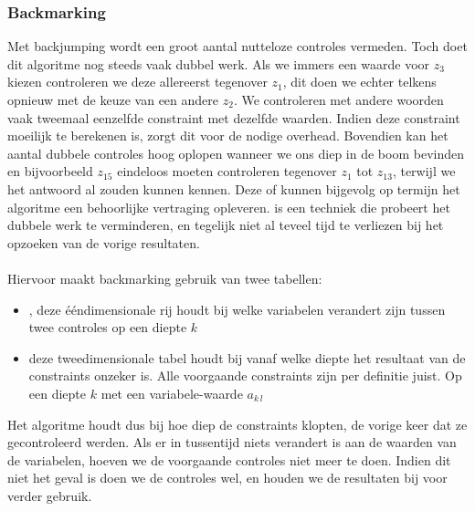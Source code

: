 \subsubsection{Backmarking}
Met backjumping wordt een groot aantal nutteloze controles vermeden. Toch doet dit algoritme nog steeds vaak dubbel werk. Als we immers een waarde voor $z_3$ kiezen controleren we deze allereerst tegenover $z_1$, dit doen we echter telkens opnieuw met de keuze van een andere $z_2$. We controleren met andere woorden vaak tweemaal eenzelfde constraint met dezelfde waarden. Indien deze constraint moeilijk te berekenen is, zorgt dit voor de nodige overhead. Bovendien kan het aantal dubbele controles hoog oplopen wanneer we ons diep in de boom bevinden en bijvoorbeeld $z_{15}$ eindeloos moeten controleren tegenover $z_1$ tot $z_{13}$, terwijl we het antwoord al zouden kunnen kennen. Deze  of  kunnen bijgevolg op termijn het algoritme een behoorlijke vertraging opleveren.  is een techniek die probeert het dubbele werk te verminderen, en tegelijk niet al teveel tijd te verliezen bij het opzoeken van de vorige resultaten.
\paragraph{}
Hiervoor maakt backmarking gebruik van twee tabellen:
\begin{itemize}
 \item {}, deze ééndimensionale rij houdt bij welke variabelen verandert zijn tussen twee controles op een diepte $k$
 \item {} deze tweedimensionale tabel houdt bij vanaf welke diepte het resultaat van de constraints onzeker is. Alle voorgaande constraints zijn per definitie juist. Op een diepte $k$ met een variabele-waarde $a_{k\,l}$
\end{itemize}
Het algoritme houdt dus bij hoe diep de constraints klopten, de vorige keer dat ze gecontroleerd werden. Als er in tussentijd niets verandert is aan de waarden van de variabelen, hoeven we de voorgaande controles niet meer te doen. Indien dit niet het geval is doen we de controles wel, en houden we de resultaten bij voor verder gebruik.
